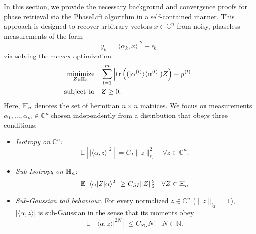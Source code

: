 In this section, we provide the necessary background and convergence proofs for phase retrieval via the PhaseLift algorithm in a self-contained manner.
This approach is designed to recover arbitrary vectors $ x \in \mathbb{C}^n$ from noisy, phaseless measurements of the form
\begin{equation}
y_k = \left| \langle \alpha_k,  x \rangle \right|^2 + \epsilon_k \label{eq:guarantee.measurements}
\end{equation}
via solving the convex optimization
\begin{align}
  \underset{{Z} \in \mathbb{H}_n}{\textrm{minimize}} & \quad \sum_{l=1}^m \left| \operatorname{tr} \left( (|\alpha^{(l)} \rangle \langle \alpha^{(l)} |) {Z} \right) - y^{(l)} \right| \label{eq:guarantee.phaselift} \\
   \textrm{subject to} &\quad  {Z} \geq 0. \nonumber
\end{align}
Here, $\mathbb{H}_n$ denotes the set of hermitian $n \times n$ matrices.
We focus on measurements $\alpha_1,\ldots,\alpha_m \in \mathbb{C}^n$ chosen independently from a distribution that obeys three conditions:
\begin{itemize}
\item \emph{Isotropy on $\mathbb{C}^n$:}
\begin{equation}
  \mathbb{E} \left[ | \langle \alpha,  z \rangle |^2 \right] = C_I \|  z \|_{\ell_2}^2 \quad \forall  z \in \mathbb{C}^n.
  \label{eq:tight_frame}
\end{equation}

\item \emph{Sub-Isotropy on $\mathbb{H}_n$}:
\begin{align}
  \mathbb{E} \left[ \langle \alpha |  Z | \alpha \rangle^2 \right] \geq C_{SI} \|  Z \|_2^2 \quad \forall  Z \in \mathbb{H}_n \label{eq:sub_isotropy}
\end{align}

\item \emph{Sub-Gaussian tail behaviour:} For every normalized $ z \in \mathbb{C}^n$ ($\|  z \|_{\ell_2}=1$), $| \langle \alpha,  z \rangle|$ is sub-Gaussian in the sense that its moments obey
\begin{equation}
  \mathbb{E} \left[ | \langle \alpha,  z \rangle|^{2N} \right] \leq C_{SG} N! \quad N \in \mathbb{N}.
\label{eq:subexponential}
\end{equation}
\end{itemize}

